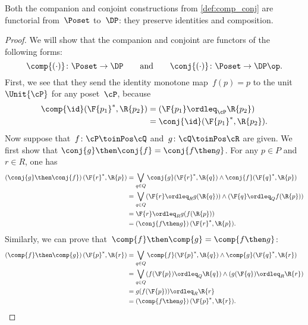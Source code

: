 \begin{lemma}
\label{prop:comp_conj}
Both the companion and conjoint constructions from \cref{def:comp_conj} are functorial from~$\Poset$ to~$\DP$: they preserve identities and composition.
\end{lemma}
\begin{proof}
We will show that the companion and conjoint are functors of the following forms:
\begin{equation}
\comp{(\cdot)}\colon\Poset\to\DP
\qquad\text{and}\qquad
\conj{(\cdot)}\colon\Poset\to\DP\op.
\end{equation}
First, we see that they send the identity monotone map~$f(p)=p$ to the unit~$\Unit{\cP }$ for any poset~$\cP $, because
\begin{equation}
    \begin{aligned}
        \comp{\id}(\F{p_1}^*,\R{p_2})&= (\F{p_1} \ordleq_{\cP} \R{p_2})\\
        &=\conj{\id}(\F{p_1}^*,\R{p_2}).
    \end{aligned}
\end{equation}
Now suppose that~$f\colon  \cP \toinPos \cQ $ and~$g\colon \cQ \toinPos \cR$ are given. We first show that $\conj{g}\then\conj{f}=\conj{f\then g}$.
For any $p\in P$ and $r\in R$, one has
\begin{equation}
\begin{aligned}
	\left(\conj{g}\then \conj{f}\right)(\F{r}^*,\R{p})
	&=\bigvee_{q\in Q} \conj{g}(\F{r}^*,\R{q})\wedge\conj{f}(\F{q}^*,\R{p})\\
	&=\bigvee_{q\in Q} (\F{r}\ordleq_R g(\R{q})) \wedge (\F{q}\ordleq_Q f(\R{p})) \\
	&= \F{r}\ordleq_R g(f(\R{p}))\\
    &=\left(\conj{f\then g}\right)(\F{r}^*,\R{p}).
\end{aligned}
\end{equation}
Similarly, we can prove that~$\comp{f}\then \comp{g}=\comp{f\then g}$:
\begin{equation}
    \begin{aligned}
    \left(\comp{f}\then \comp{g}\right)(\F{p}^*,\R{r})&=\bigvee_{q\in Q} \comp{f}(\F{p}^*,\R{q})\wedge\comp{g}(\F{q}^*,\R{r})\\
    &=\bigvee_{q\in Q} (f(\F{p})\ordleq_Q \R{q})\wedge (g(\F{q})\ordleq_R \R{r})\\
    &=g(f(\F{p}))\ordleq_R \R{r}\\
    &=\left(\comp{f\then g}\right)(\F{p}^*,\R{r}).
    \end{aligned}
\end{equation}
\end{proof}

